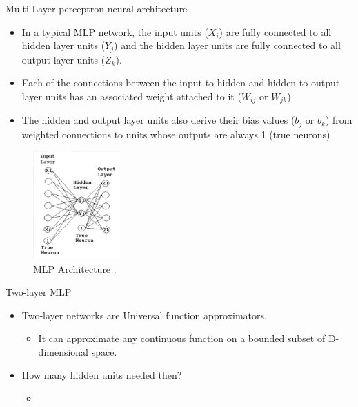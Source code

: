 \begin{frame}{Multi-Layer perceptron neural architecture}
    \begin{itemize}
        \item In a typical MLP network, the input units ($X_i$) are fully
connected to all hidden layer units ($Y_j$) and the hidden layer
units are fully connected to all output layer units ($Z_k$).
        \item Each of the connections
between the input to hidden
and hidden to output layer
units has an associated weight
attached to it ($W_{ij}$ or $W_{jk}$)
        \item The hidden and output layer
units also derive their bias
values ($b_j$ or $b_k$) from
weighted connections to units
whose outputs are always 1
(true neurons)
    \end{itemize}
	\begin{figure}[H]
		\centering
		\includegraphics[width=0.3\textwidth]{Images/MLP2.png}
		\caption{MLP Architecture \cite{Gonna Replace It/}.}
	\end{figure}
\end{frame}

\begin{frame}{Two-layer MLP}
    \begin{itemize}
        \item Two-layer networks are Universal function approximators.
        \begin{itemize}
            \item It can approximate any continuous function on a bounded subset of D-dimensional space.
        \end{itemize}
        \item How many hidden units needed then?
        \begin{itemize}
            \item 
        \end{itemize}
    \end{itemize}
\end{frame}

